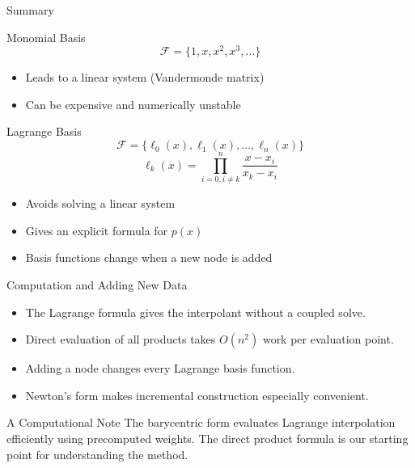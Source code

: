 \documentclass[10pt]{beamer}
\begin{document}
\begin{frame}{Summary}

\begin{block}{Monomial Basis}
$$ \mathcal{F}= \{1, x, x^2, x^3,\ldots \}$$
\begin{itemize}
    \item Leads to a linear system (Vandermonde matrix)
    \item Can be expensive and numerically unstable
\end{itemize}
\end{block}

\begin{block}{Lagrange Basis}
$$\mathcal{F} = \{ \ell_0(x), \ell_1(x),\ldots, \ell_n(x) \}$$ 
\[
\ell_k(x) = \prod_{i=0,i\ne k}^{n} \frac{x-x_i}{x_k - x_i}
\]

\begin{itemize}
    \item Avoids solving a linear system
    \item Gives an explicit formula for $p(x)$
    \item Basis functions change when a new node is added
\end{itemize}
\end{block}

\end{frame}

\begin{frame}{Computation and Adding New Data}
\begin{itemize}
    \item The Lagrange formula gives the interpolant without a coupled solve.
    \item Direct evaluation of all products takes $O(n^2)$ work per evaluation point.
    \item Adding a node changes every Lagrange basis function.
    \item Newton's form makes incremental construction especially convenient.
\end{itemize}
\begin{block}{A Computational Note}
The barycentric form evaluates Lagrange interpolation efficiently using
precomputed weights. The direct product formula is our starting point
for understanding the method.
\end{block}
\end{frame}
\end{document}
